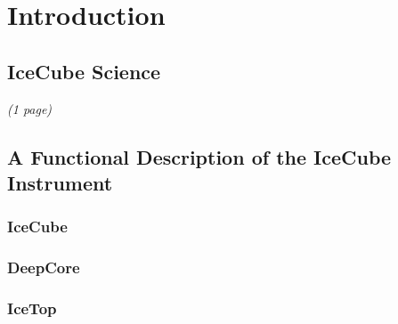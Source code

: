 
\section{Introduction}

\subsection{IceCube Science}
\textsl{(1 page)}

\subsection{A Functional Description of the IceCube Instrument}

\subsubsection{IceCube}

\subsubsection{DeepCore}

\subsubsection{IceTop}


